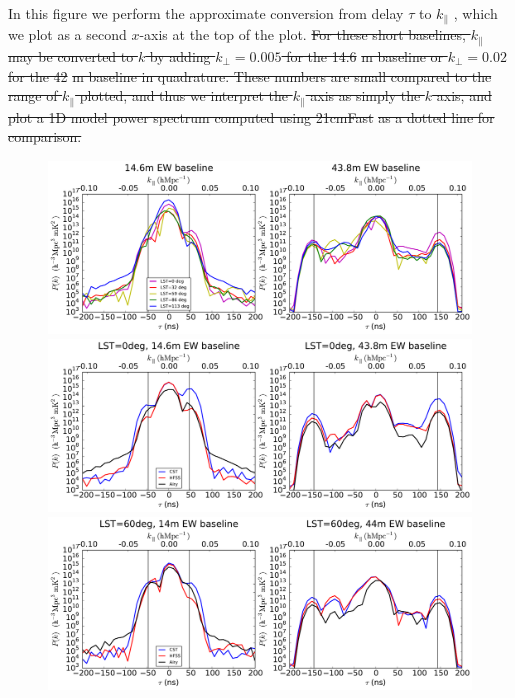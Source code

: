 \documentclass{emulateapj}
\providecommand{\DIFadd}[1]{{\protect\color{blue}\uwave{#1}}} %
\providecommand{\DIFdel}[1]{{\protect\color{red}\sout{#1}}}                      %
\providecommand{\DIFaddbegin}{} %
\providecommand{\DIFaddend}{} %
\providecommand{\DIFdelbegin}{} %
\providecommand{\DIFdelend}{} %
\begin{document}
\DIFdelend In this figure we perform the approximate conversion from delay $\tau$ to $k_\parallel$ \DIFaddbegin \DIFadd{at $z=8$}\DIFaddend , which we plot as a second $x$-axis at the top of the plot. 
\DIFdelbegin \DIFdel{For these short baselines, $k_\parallel$ may be converted to $k$ by adding $k_\perp=0.005$ for the 14.6}%
\DIFdel{m baseline or $k_\perp=0.02$ for the 42}%
\DIFdel{m baseline in quadrature. These numbers are small compared to the range of $k_\parallel$ plotted, and thus we interpret the $k_\parallel$ axis as simply the $k$ axis, and plot a 1D model power spectrum computed using 21cmFast }%
\DIFdel{as a dotted line for comparison. 
}\DIFdelend 

\begin{figure}[h]
\centering
\includegraphics[width=6in]{nithya_fg_pspec_all_lst.pdf}
\includegraphics[width=6in]{nithya_fg_pspec_lst0deg.pdf}
\includegraphics[width=6in]{nithya_fg_pspec_lst60deg.pdf}

\end{figure}
\end{document}
